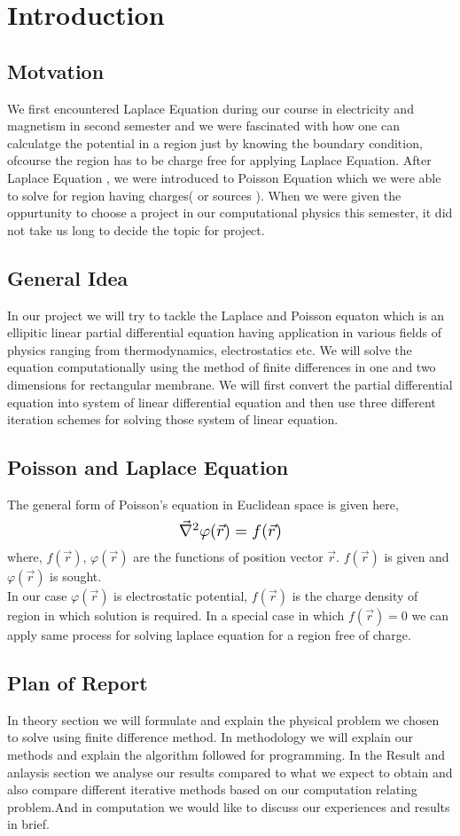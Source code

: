 	\section {Introduction}
    \subsection{Motvation}
    \noindent 
    We first encountered Laplace Equation during our course in electricity and magnetism in second semester and we were fascinated with how one can calculatge the potential in a region just by knowing the boundary condition, ofcourse the region has to be charge free for applying Laplace Equation. After Laplace Equation , we were introduced to Poisson Equation which we were able to solve for region having charges( or sources ). When we were given the oppurtunity to choose a project in our computational physics this semester, it did not take us long to decide the topic for project.
    \subsection{General Idea}
    \noindent
    In our project we will try to tackle the Laplace and Poisson equaton which is an ellipitic linear partial differential equation having application in various fields of physics ranging from thermodynamics, electrostatics etc. We will solve the equation computationally using the method of finite differences in one and two dimensions for rectangular membrane. We will first convert the partial differential equation into system of linear differential equation and then use three different iteration schemes for solving those system of linear equation.\\ 
    \subsection{Poisson and Laplace Equation}
    	The general form of Poisson's equation in Euclidean space is given here,
    \[
    \scalebox{1.3}{$\vec{\nabla}^2 \varphi(\vec{r}) = f(\vec{r})$}
    \]
    where, $f(\vec{r})$, $\varphi(\vec{r})$ are the functions of position vector $\vec{r}$. $f(\vec{r})$ is given and $\varphi(\vec{r})$ is sought. \\
    In our case  $\varphi(\vec{r})$ is electrostatic potential, $ f(\vec{r})$ is the charge density of region in which solution is required. In a special case in which  $f(\vec{r}) = 0 $ we can apply same process for solving laplace equation for a region free of charge.
    \subsection{Plan of Report}
    In theory section we will formulate and explain the physical problem we chosen to solve using finite difference method. In methodology we will explain our methods and explain the algorithm followed for programming. In the Result and anlaysis section we analyse our results compared to what we expect to obtain and also compare different iterative methods based on our computation relating problem.And in computation we would like to discuss our experiences and results in brief.